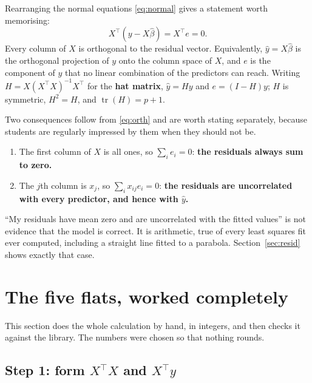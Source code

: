 \documentclass[11pt]{article}
\newcommand{\Xt}{X^{\!\top}}
\begin{document}
Rearranging the normal equations \eqref{eq:normal} gives a statement worth
memorising:
\begin{equation}
  \label{eq:orth}
  \Xt(y - X\hat\beta) = \Xt e = 0 .
\end{equation}
Every column of $X$ is orthogonal to the residual vector. Equivalently,
$\hat y = X\hat\beta$ is the orthogonal projection of $y$ onto the column
space of $X$, and $e$ is the component of $y$ that no linear combination of
the predictors can reach. Writing $H = X(\Xt X)^{-1}\Xt$ for the \textbf{hat
matrix}, $\hat y = Hy$ and $e = (I - H)y$; $H$ is symmetric, $H^2 = H$, and
$\operatorname{tr}(H) = p+1$.

Two consequences follow from \eqref{eq:orth} and are worth stating separately,
because students are regularly impressed by them when they should not be.

\begin{enumerate}[leftmargin=*]
  \item The first column of $X$ is all ones, so $\sum_i e_i = 0$:
    \textbf{the residuals always sum to zero.}
  \item The $j$th column is $x_j$, so $\sum_i x_{ij}e_i = 0$:
    \textbf{the residuals are uncorrelated with every predictor, and hence
    with $\hat y$.}
\end{enumerate}

\begin{caution}
``My residuals have mean zero and are uncorrelated with the fitted values'' is
not evidence that the model is correct. It is arithmetic, true of every least
squares fit ever computed, including a straight line fitted to a parabola.
Section~\ref{sec:resid} shows exactly that case.
\end{caution}

\notesources{\AMLUnitVSources}

\section{The five flats, worked completely}
\label{sec:hand}

This section does the whole calculation by hand, in integers, and then checks
it against the library. The numbers were chosen so that nothing rounds.

\subsection{\texorpdfstring{Step 1: form $\Xt X$ and $\Xt y$}{Step 1: form X\textquotesingle X and X\textquotesingle y}}
\end{document}
